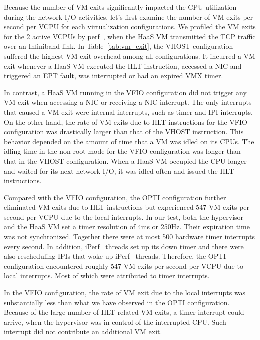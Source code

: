 
Because the number of VM exits significantly impacted the CPU
utilization during the network I/O activities, let's first
examine the number of VM exits per second per VCPU for each
virtualization configurations. We profiled the VM exits for
the 2 active VCPUs by perf~\cite{perf}, when the HaaS VM
transmitted the TCP traffic over an Infiniband link. In
Table~\ref{tab:vm_exit}, the VHOST configuration suffered the
highest VM-exit overhead among all configurations. It incurred
a VM exit whenever a HaaS VM executed the HLT instruction,
accessed a NIC and triggered an EPT fault, was interrupted or
had an expired VMX timer.

In contrast, a HaaS VM running in the VFIO configuration did
not trigger any VM exit when accessing a NIC or receiving a
NIC interrupt. The only interrupts that caused a VM exit were
internal interrupts, such as timer and IPI interrupts. On the
other hand, the rate of VM exits due to HLT instructions for
the VFIO configuration was drastically larger than that of the
VHOST instruction. This behavior depended on the amount of
time that a VM was idled on its CPUs. The idling time in the
non-root mode for the VFIO configuration was longer than that
in the VHOST configuration. When a HaaS VM occupied the CPU
longer and waited for its next network I/O, it was idled often
and issued the HLT instructions.

Compared with the VFIO configuration, the OPTI configuration
further eliminated VM exits due to HLT instructions but
experienced 547 VM exits per second per VCPU due to the local
interrupts. In our test, both the hypervisor and the HaaS VM
set a timer resolution of 4ms or 250Hz. Their expiration time
was not synchronized. Together there were at most 500 hardware
timer interrupts every second. In addition, iPerf~\cite{iperf}
threads set up its down timer and there were also rescheduling
IPIs that woke up iPerf~\cite{iperf} threads. Therefore, the
OPTI configuration encountered roughly 547 VM exits per second
per VCPU due to local interrupts. Most of which were
attributed to timer interrupts.

In the VFIO configuration, the rate of VM exit due to the
local interrupts was substantially less than what we have
observed in the OPTI configuration. Because of the large
number of HLT-related VM exits, a timer interrupt could
arrive, when the hypervisor was in control of the interrupted
CPU. Such interrupt did not contribute an additional VM exit.

